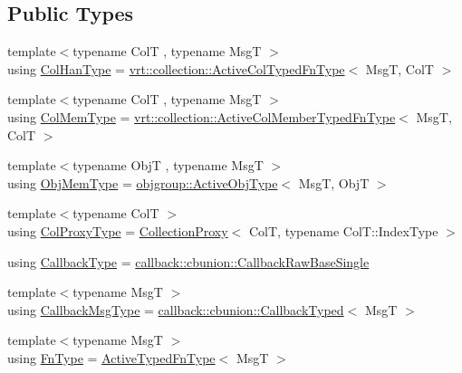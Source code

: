\subsection*{Public Types}
\begin{DoxyCompactItemize}
\item 
{\footnotesize template$<$typename ColT , typename MsgT $>$ }\\using \hyperlink{structvt_1_1pipe_1_1_pipe_manager_t_l_a0bf4e2e805b3ce2be9f499e0e39aadfa}{Col\+Han\+Type} = \hyperlink{namespacevt_1_1vrt_1_1collection_a939327f58a5838cf9d7dcc7f14d1670c}{vrt\+::collection\+::\+Active\+Col\+Typed\+Fn\+Type}$<$ MsgT, ColT $>$
\item 
{\footnotesize template$<$typename ColT , typename MsgT $>$ }\\using \hyperlink{structvt_1_1pipe_1_1_pipe_manager_t_l_abf7ad21be4f3d0db51d643aa8ea959cc}{Col\+Mem\+Type} = \hyperlink{namespacevt_1_1vrt_1_1collection_a87925616c03cf4ccc548d33b2fe172ee}{vrt\+::collection\+::\+Active\+Col\+Member\+Typed\+Fn\+Type}$<$ MsgT, ColT $>$
\item 
{\footnotesize template$<$typename ObjT , typename MsgT $>$ }\\using \hyperlink{structvt_1_1pipe_1_1_pipe_manager_t_l_a1a8a2e05fd84f8ac7b7dda4b64e5abe5}{Obj\+Mem\+Type} = \hyperlink{namespacevt_1_1objgroup_a979bd9dc714fdacafc4b83f98271bc23}{objgroup\+::\+Active\+Obj\+Type}$<$ MsgT, ObjT $>$
\item 
{\footnotesize template$<$typename ColT $>$ }\\using \hyperlink{structvt_1_1pipe_1_1_pipe_manager_t_l_af56c58cad882496e35f01227d4da3898}{Col\+Proxy\+Type} = \hyperlink{namespacevt_a0d58a693bfb96e0ce5d145692a1a1f98}{Collection\+Proxy}$<$ ColT, typename Col\+T\+::\+Index\+Type $>$
\item 
using \hyperlink{structvt_1_1pipe_1_1_pipe_manager_t_l_a1cc1d0f1c80a36488f9b5d282e9755d2}{Callback\+Type} = \hyperlink{structvt_1_1pipe_1_1callback_1_1cbunion_1_1_callback_raw_base_single}{callback\+::cbunion\+::\+Callback\+Raw\+Base\+Single}
\item 
{\footnotesize template$<$typename MsgT $>$ }\\using \hyperlink{structvt_1_1pipe_1_1_pipe_manager_t_l_af6fc2c17f1729fa06450441b0ee81cb1}{Callback\+Msg\+Type} = \hyperlink{structvt_1_1pipe_1_1callback_1_1cbunion_1_1_callback_typed}{callback\+::cbunion\+::\+Callback\+Typed}$<$ MsgT $>$
\item 
{\footnotesize template$<$typename MsgT $>$ }\\using \hyperlink{structvt_1_1pipe_1_1_pipe_manager_t_l_ac2c474a68a93bbc8e1d86eb99dabf1dc}{Fn\+Type} = \hyperlink{namespacevt_a54eefd5373739c7365058b0d22fea6e2}{Active\+Typed\+Fn\+Type}$<$ MsgT $>$

\end{DoxyCompactItemize}
